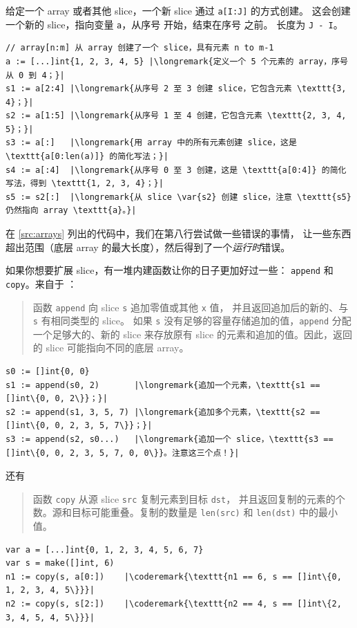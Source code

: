 给定一个 array 或者其他 slice，一个新 slice 通过 \lstinline{a[I:J]}
的方式创建。
这会创建一个新的 slice，指向变量 \lstinline{a}，从序号  开始，结束在序号 之前。
长度为 \lstinline{J - I}。

\begin{lstlisting}
// array[n:m] 从 array 创建了一个 slice，具有元素 n to m-1
a := [...]int{1, 2, 3, 4, 5} |\longremark{定义一个 5 个元素的 array，序号从 0 到 4；}|
s1 := a[2:4] |\longremark{从序号 2 至 3 创建 slice，它包含元素 \texttt{3, 4}；}|
s2 := a[1:5] |\longremark{从序号 1 至 4 创建，它包含元素 \texttt{2, 3, 4, 5}；}|
s3 := a[:]   |\longremark{用 array 中的所有元素创建 slice，这是 \texttt{a[0:len(a)]} 的简化写法；}|
s4 := a[:4]  |\longremark{从序号 0 至 3 创建，这是 \texttt{a[0:4]} 的简化写法，得到 \texttt{1, 2, 3, 4}；}|
s5 := s2[:]  |\longremark{从 slice \var{s2} 创建 slice，注意 \texttt{s5} 仍然指向 array \texttt{a}。}|
\end{lstlisting}
\showremarks

在 \ref{src:arrays} 列出的代码中，我们在第八行尝试做一些错误的事情，
让一些东西超出范围（底层 array 的最大长度），然后得到了一个\emph{运行时}错误。

如果你想要扩展 slice，有一堆内建函数让你的日子更加好过一些：
\lstinline{append} 和 \lstinline{copy}。来自于 \cite{go_spec}：
\begin{quote}
函数 \lstinline{append} 向 slice \lstinline{s} 追加零值或其他 \lstinline{x} 值，
并且返回追加后的新的、与 \lstinline{s} 有相同类型的 slice。
如果 \lstinline{s} 没有足够的容量存储追加的值，\lstinline{append} 分配一个足够大的、新的 slice
来存放原有 slice 的元素和追加的值。因此，返回的 slice 可能指向不同的底层 array。
\end{quote}
\begin{lstlisting}
s0 := []int{0, 0}
s1 := append(s0, 2)       |\longremark{追加一个元素，\texttt{s1 == []int\{0, 0, 2\}}；}|
s2 := append(s1, 3, 5, 7) |\longremark{追加多个元素，\texttt{s2 == []int\{0, 0, 2, 3, 5, 7\}}；}|
s3 := append(s2, s0...)   |\longremark{追加一个 slice，\texttt{s3 == []int\{0, 0, 2, 3, 5, 7, 0, 0\}}。注意这三个点！}|
\end{lstlisting}
\showremarks
还有
\begin{quote}
函数 \lstinline{copy} 从源 slice \lstinline{src} 复制元素到目标 \lstinline{dst}，
并且返回复制的元素的个数。源和目标可能重叠。复制的数量是 \lstinline{len(src)} 和
\mbox{\lstinline{len(dst)}} 中的最小值。
\end{quote}
\begin{lstlisting}
var a = [...]int{0, 1, 2, 3, 4, 5, 6, 7}
var s = make([]int, 6)
n1 := copy(s, a[0:])    |\coderemark{\texttt{n1 == 6, s == []int\{0, 1, 2, 3, 4, 5\}}}|
n2 := copy(s, s[2:])    |\coderemark{\texttt{n2 == 4, s == []int\{2, 3, 4, 5, 4, 5\}}}|
\end{lstlisting}

